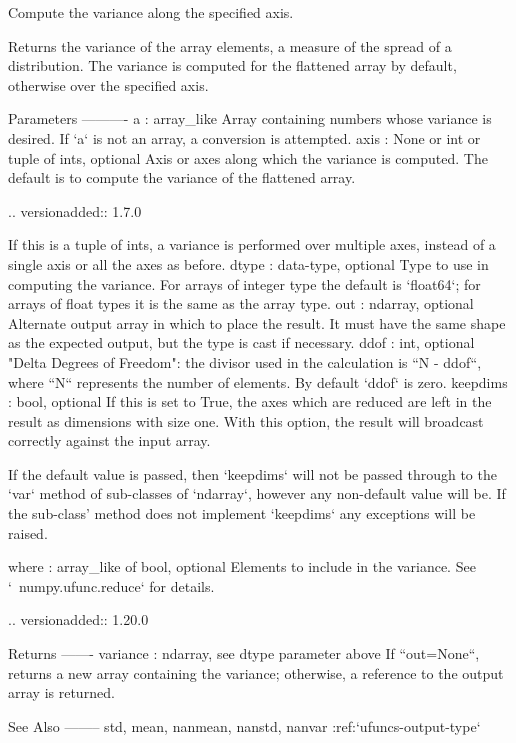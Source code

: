 \begin{DoxyVerb}Compute the variance along the specified axis.

Returns the variance of the array elements, a measure of the spread of a
distribution.  The variance is computed for the flattened array by
default, otherwise over the specified axis.

Parameters
----------
a : array_like
    Array containing numbers whose variance is desired.  If `a` is not an
    array, a conversion is attempted.
axis : None or int or tuple of ints, optional
    Axis or axes along which the variance is computed.  The default is to
    compute the variance of the flattened array.

    .. versionadded:: 1.7.0

    If this is a tuple of ints, a variance is performed over multiple axes,
    instead of a single axis or all the axes as before.
dtype : data-type, optional
    Type to use in computing the variance.  For arrays of integer type
    the default is `float64`; for arrays of float types it is the same as
    the array type.
out : ndarray, optional
    Alternate output array in which to place the result.  It must have
    the same shape as the expected output, but the type is cast if
    necessary.
ddof : int, optional
    "Delta Degrees of Freedom": the divisor used in the calculation is
    ``N - ddof``, where ``N`` represents the number of elements. By
    default `ddof` is zero.
keepdims : bool, optional
    If this is set to True, the axes which are reduced are left
    in the result as dimensions with size one. With this option,
    the result will broadcast correctly against the input array.

    If the default value is passed, then `keepdims` will not be
    passed through to the `var` method of sub-classes of
    `ndarray`, however any non-default value will be.  If the
    sub-class' method does not implement `keepdims` any
    exceptions will be raised.

where : array_like of bool, optional
    Elements to include in the variance. See `~numpy.ufunc.reduce` for
    details.

    .. versionadded:: 1.20.0

Returns
-------
variance : ndarray, see dtype parameter above
    If ``out=None``, returns a new array containing the variance;
    otherwise, a reference to the output array is returned.

See Also
--------
std, mean, nanmean, nanstd, nanvar
:ref:`ufuncs-output-type`


\end{DoxyVerb}
